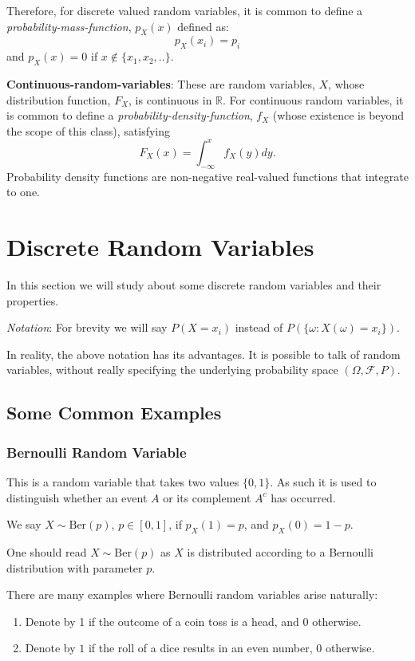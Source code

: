 Therefore, for discrete valued random variables, it is common to define a \textit{probability-mass-function}, $p_X(x)$ defined as:
$$ p_X(x_i) = p_i$$
and $p_X(x)=0 $ if $x \notin \{x_1,x_2,..\}.$


\textbf{Continuous-random-variables}: These are random variables, $X$, whose distribution function, $F_X$, is continuous in $\mathbb{R}$. For continuous random variables, it is common to define a \textit{probability-density-function}, $f_X$ (whose existence is beyond the scope of this class), satisfying
$$  F_X(x) = \int_{-\infty}^x f_X(y) dy.$$
Probability density functions are non-negative real-valued functions that integrate to one.

\section{Discrete Random Variables}
In this section we will study about some discrete random variables and their properties.

\textit{Notation}: For brevity we will say $P(X=x_i)$ instead of $P(\{\omega: X(\omega)=x_i\})$.

\begin{remark}
In reality, the above notation has its advantages. It is possible to talk of random variables, without really specifying the underlying probability space $(\Omega,\mathcal{F},P)$.
\end{remark}

\subsection{Some Common Examples}

\subsubsection{Bernoulli Random Variable} This is a random variable that takes two values $\{0,1\}$. As such it is used to distinguish whether an event $A$ or its complement $A^c$ has occurred.

We say $X \sim \textrm{Ber}(p)$, $p \in [0,1]$, if $p_X(1)=p$, and $p_X(0)=1-p.$

One should read $X \sim \textrm{Ber}(p)$ as $X$ is distributed according to a Bernoulli distribution with parameter $p$.

There are many examples where Bernoulli random variables arise naturally:
\begin{enumerate}
    \item Denote by 1 if the outcome of a coin toss is a head, and $0$ otherwise.
    \item Denote by $1$ if the roll of a dice results in an even number, $0$ otherwise.
\end{enumerate}

